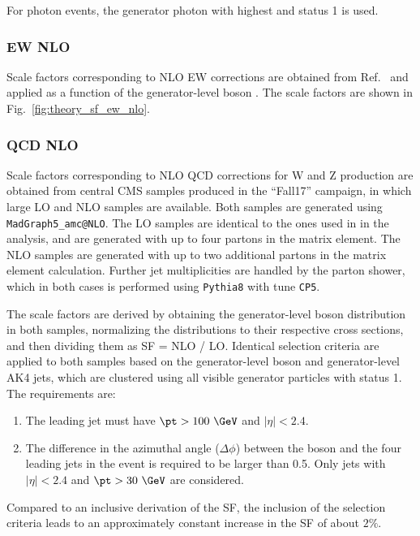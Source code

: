 For photon events, the generator photon with highest \pt and status 1 is used.

\subsubsection{EW NLO}
Scale factors corresponding to NLO EW corrections are obtained from Ref.~\cite{DMTheory} and applied as a function of the generator-level boson \pt. The scale factors are shown in Fig.~\ref{fig:theory_sf_ew_nlo}.

\subsubsection{QCD NLO}

Scale factors corresponding to NLO QCD corrections for W and Z production are obtained from central CMS samples produced in the ``Fall17'' campaign, in which large LO and NLO samples are available. Both samples are generated using \texttt{MadGraph5\_amc@NLO}. The LO samples are identical to the ones used in in the analysis, and are generated with up to four partons in the matrix element. The NLO samples are generated with up to two additional partons in the matrix element calculation. Further jet multiplicities are handled by the parton shower, which in both cases is performed using \texttt{Pythia8} with tune \texttt{CP5}.

The scale factors are derived by obtaining the generator-level boson \pt distribution in both samples, normalizing the distributions to their respective cross sections, and then dividing them as SF = NLO / LO. Identical selection criteria are applied to both samples based on the generator-level boson and generator-level AK4 jets, which are clustered using all visible generator particles with status 1. The requirements are:

\begin{enumerate}
\item The leading jet must have $\pt>100~\GeV$ and $|\eta|< 2.4$.
\item The difference in the azimuthal angle ($\Delta\phi$) between the boson and the four leading jets in the event is required to be larger than 0.5. Only jets with $|\eta|<2.4$ and $\pt>30~\GeV$ are considered.
\end{enumerate}

Compared to an inclusive derivation of the SF, the inclusion of the selection criteria leads to an approximately constant increase in the SF of about $2\%$.

